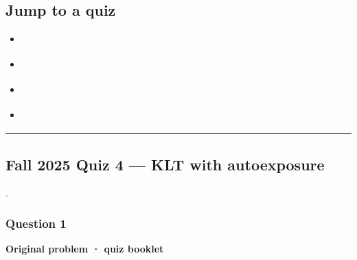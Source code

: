 \documentclass[letterpaper,11pt,english,openany,oneside]{jupyterBook}
\begin{document}
\subsection{Jump to a quiz}
\label{\detokenize{lectures/lecture05/quiz-workbook:jump-to-a-quiz}}\begin{itemize}
\item {}
\sphinxAtStartPar
{\hyperref[\detokenize{lectures/lecture05/quiz-workbook:quiz-source-9}]{}}

\item {}
\sphinxAtStartPar
{\hyperref[\detokenize{lectures/lecture05/quiz-workbook:quiz-source-13}]{}}

\item {}
\sphinxAtStartPar
{\hyperref[\detokenize{lectures/lecture05/quiz-workbook:quiz-source-a2}]{}}

\item {}
\sphinxAtStartPar
{\hyperref[\detokenize{lectures/lecture05/quiz-workbook:quiz-source-a3}]{}}

\end{itemize}


\bigskip\hrule\bigskip



\subsection{Fall 2025 Quiz 4 — KLT with auto\sphinxhyphen{}exposure}
\label{\detokenize{lectures/lecture05/quiz-workbook:fall-2025-quiz-4-klt-with-auto-exposure}}\label{\detokenize{lectures/lecture05/quiz-workbook:quiz-source-9}}
\sphinxAtStartPar
{} .


\subsubsection{Question 1}
\label{\detokenize{lectures/lecture05/quiz-workbook:question-1}}\label{\detokenize{lectures/lecture05/quiz-workbook:quiz-9-q1}}
\par\medskip\textbf{Original problem · quiz booklet}\par\smallskip
\end{document}
